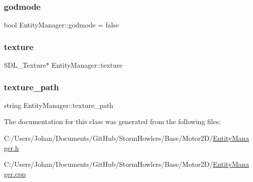 \mbox{\label{class_entity_manager_ada03c701dcfe1a2751be416cdd42b556}} 
\subsubsection{\texorpdfstring{godmode}{godmode}}
{\footnotesize\ttfamily bool Entity\+Manager\+::godmode = false}

\mbox{\label{class_entity_manager_a87bae2d70d4acbf8aa4e22c412a01f65}} 
\subsubsection{\texorpdfstring{texture}{texture}}
{\footnotesize\ttfamily S\+D\+L\+\_\+\+Texture$\ast$ Entity\+Manager\+::texture}

\mbox{\label{class_entity_manager_a2dbc8776addfb76925b05afc712b34f7}} 
\subsubsection{\texorpdfstring{texture\_path}{texture\_path}}
{\footnotesize\ttfamily string Entity\+Manager\+::texture\+\_\+path}



The documentation for this class was generated from the following files\+:\begin{DoxyCompactItemize}
\item 
C\+:/\+Users/\+Johan/\+Documents/\+Git\+Hub/\+Storm\+Howlers/\+Base/\+Motor2\+D/\mbox{\hyperlink{_entity_manager_8h}{Entity\+Manager.\+h}}\item 
C\+:/\+Users/\+Johan/\+Documents/\+Git\+Hub/\+Storm\+Howlers/\+Base/\+Motor2\+D/\mbox{\hyperlink{_entity_manager_8cpp}{Entity\+Manager.\+cpp}}\end{DoxyCompactItemize}
